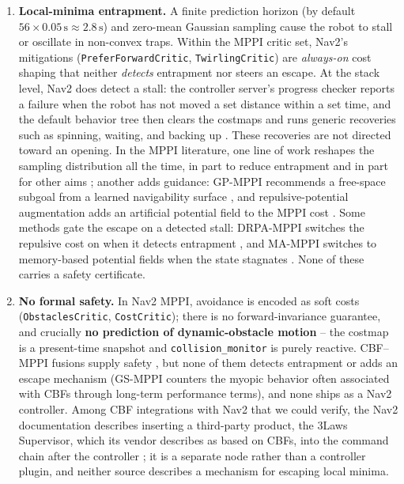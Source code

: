 \documentclass[journal]{IEEEtran}
\begin{document}
\begin{enumerate}
\item \textbf{Local-minima entrapment.} A finite prediction horizon (by
  default $56 \times 0.05\,\mathrm{s} \approx 2.8\,\mathrm{s}$) and
  zero-mean Gaussian sampling cause the robot to stall or oscillate in
  non-convex traps. Within the MPPI critic set, Nav2's mitigations
  (\texttt{PreferForwardCritic}, \texttt{TwirlingCritic}) are
  \emph{always-on} cost shaping that neither \emph{detects} entrapment nor
  steers an escape. At the stack level, Nav2 does detect a stall: the
  controller server's progress checker reports a failure when the robot
  has not moved a set distance within a set time, and the default behavior
  tree then clears the costmaps and runs generic recoveries such as
  spinning, waiting, and backing up \cite{nav2,nav2_progress,nav2_bt}.
  These recoveries are not directed toward an opening. In the MPPI
  literature, one line of work reshapes the sampling distribution all the
  time, in part to reduce entrapment \cite{log_mppi,biased_mppi,flow_mppi}
  and in part for other aims \cite{tsallis_mppi,svg_mppi}; another adds
  guidance: GP-MPPI recommends a free-space subgoal from a learned
  navigability surface \cite{gp_mppi}, and repulsive-potential
  augmentation adds an artificial potential field to the MPPI cost
  \cite{drpa_sii}. Some methods gate the escape on a detected stall:
  DRPA-MPPI switches the repulsive cost on when it detects entrapment
  \cite{drpa_mppi}, and MA-MPPI switches to memory-based potential fields
  when the state stagnates \cite{ma_mppi}. None of these carries a safety
  certificate.
\item \textbf{No formal safety.} In Nav2 MPPI, avoidance is encoded as
  soft costs (\texttt{ObstaclesCritic}, \texttt{CostCritic}); there is no
  forward-invariance guarantee, and crucially \textbf{no prediction of
  dynamic-obstacle motion} -- the costmap is a present-time snapshot and
  \texttt{collision\_monitor} is purely reactive. CBF--MPPI fusions supply
  safety \cite{shield_mppi,br_mppi,scbf_mppi,dualguard,gs_mppi}, but none
  of them detects entrapment or adds an escape mechanism (GS-MPPI counters
  the myopic behavior often associated with CBFs through long-term
  performance terms), and none ships as a Nav2 controller. Among CBF
  integrations with Nav2 that we could verify, the Nav2 documentation
  describes inserting a third-party product, the 3Laws Supervisor, which
  its vendor describes as based on CBFs, into the command chain after the
  controller \cite{nav2_3laws,threelaws_pr}; it is a separate node rather
  than a controller plugin, and neither source describes a mechanism for
  escaping local minima.
\end{enumerate}
\end{document}
